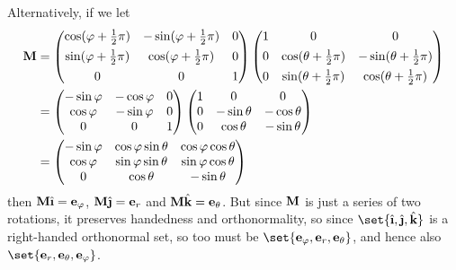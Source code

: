 \documentclass[fleqn,a4paper,11pt]{article}
\begin{document}
\begin{enumerate}
    Alternatively, if we let
    \begin{align*}
     \mathbf{M} &=
      \begin{pmatrix}
       \cos(\varphi + \tfrac 12 \pi) & -\sin(\varphi + \tfrac 12 \pi) & 0
        \\[4pt]
       \sin(\varphi + \tfrac 12 \pi) & \cos(\varphi + \tfrac 12 \pi) & 0
        \\[4pt]
       0 & 0 & 1
      \end{pmatrix}
      \begin{pmatrix}
       1 & 0 & 0 \\[4pt]
       0 & \cos(\theta + \tfrac 12 \pi) & -\sin(\theta + \tfrac 12 \pi)
        \\[4pt]
       0 & \sin(\theta + \tfrac 12 \pi) & \cos(\theta + \tfrac 12 \pi)
      \end{pmatrix} \\
      &=
      \begin{pmatrix}
       -\sin \varphi & -\cos \varphi & 0 \\
       \cos \varphi & -\sin \varphi & 0 \\
       0 & 0 & 1
      \end{pmatrix}
      \begin{pmatrix}
       1 & 0 & 0 \\
       0 & -\sin \theta & -\cos \theta \\
       0 & \cos \theta & -\sin \theta
      \end{pmatrix} \\
      &=
      \begin{pmatrix}
       -\sin \varphi & \cos \varphi \sin \theta & \cos \varphi \cos \theta \\
       \cos \varphi & \sin \varphi \sin \theta & \sin \varphi \cos \theta \\
       0 & \cos \theta & -\sin \theta
      \end{pmatrix}
    \end{align*}
    then
    \(\mat M \uveci = \vec e_\phi\),
    \(\mat M \uvecj = \vec e_r\) and
    \(\mathbf{M} \hat{\mathrm{\mathbf{k}}} = \mathrm{\mathbf{e}}_\theta\). But since \(\mathbf{M}\) is just a series of
    two rotations, it preserves handedness and orthonormality, so since
    \(\set{\uveci, \uvecj, \uveck}\) is a right-handed orthonormal set, so too
    must be \(\set{\vec e_\phi, \vec e_r, \vec e_\theta}\), and hence also
    \(\set{\vec e_r, \vec e_\theta, \vec e_\phi}\).
 \end{enumerate}
\end{document}
